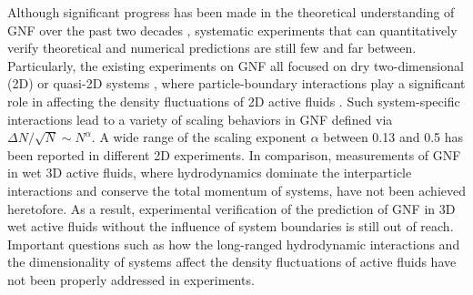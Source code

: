 \documentclass[twocolumn,aps,prx,amsmath,amssymb,longbibliography]{revtex4-2}
\begin{document}
Although significant progress has been made in the theoretical understanding of GNF over the past two decades \cite{Toner1995, Tu1998, Toner1998, AditiSimha2002, Ramaswamy2003, Toner2005, Chate2008, Mishra2010, Dey2012, Saintillan2012, Saintillan2013, Ngo2014,  Mahault2019}, systematic experiments that can quantitatively verify theoretical and numerical predictions are still few and far between. Particularly, the existing experiments on GNF all focused on dry two-dimensional (2D) or quasi-2D systems \cite{Narayan2007, Aranson2008, Kudrolli2008, Deseigne2010, Zhang2010, Schaller2013, Nishiguchi2017, Kawaguchi2017, Palacci2013}, where particle-boundary interactions play a significant role in affecting the density fluctuations of 2D active fluids \cite{Marchetti2013}. Such system-specific interactions lead to a variety of scaling behaviors in GNF defined via $\Delta N/\sqrt N \sim N^\alpha$. A wide range of the scaling exponent $\alpha$ between 0.13 and 0.5 has been reported in different 2D experiments. In comparison, measurements of GNF in wet 3D active fluids, where hydrodynamics dominate the interparticle interactions and conserve the total momentum of systems, have not been achieved heretofore. As a result, experimental verification of the prediction of GNF in 3D wet active fluids without the influence of system boundaries is still out of reach. Important questions such as how the long-ranged hydrodynamic interactions and the dimensionality of systems affect the density fluctuations of active fluids have not been properly addressed in experiments.
\end{document}
